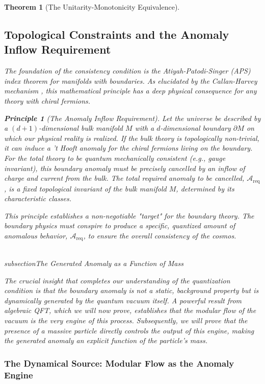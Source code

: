 \documentclass[11pt, letterpaper]{report}
\theoremstyle{plain} %
\newtheorem{theorem}{Theorem}[chapter]
\theoremstyle{definition} %
\newtheorem{principle}{Principle}[chapter]
\theoremstyle{remark} %
\newcommand{\BulkM}{M}
\newcommand{\BoundaryM}{\partial\BulkM}
\begin{document}
\begin{theorem}[The Unitarity-Monotonicity Equivalence]
\subsection{Topological Constraints and the Anomaly Inflow Requirement}
\label{sec:topological_constraints_anomaly_inflow}
The foundation of the consistency condition is the Atiyah-Patodi-Singer (APS) index theorem for manifolds with boundaries. As elucidated by the Callan-Harvey mechanism \cite{CallanHarvey1985}, this mathematical principle has a deep physical consequence for any theory with chiral fermions.

\begin{principle}[The Anomaly Inflow Requirement]
\label{principle:anomaly_inflow_c4}
Let the universe be described by a $(d+1)$-dimensional bulk manifold $\BulkM$ with a $d$-dimensional boundary $\BoundaryM$ on which our physical reality is realized. If the bulk theory is topologically non-trivial, it can induce a 't Hooft anomaly for the chiral fermions living on the boundary. For the total theory to be quantum mechanically consistent (e.g., gauge invariant), this boundary anomaly must be precisely cancelled by an inflow of charge and current from the bulk. The total required anomaly to be cancelled, $\mathcal{A}_{\text{req}}$, is a fixed topological invariant of the bulk manifold $\BulkM$, determined by its characteristic classes.
\end{principle}

This principle establishes a non-negotiable "target" for the boundary theory. The boundary physics must conspire to produce a specific, quantized amount of anomalous behavior, $\mathcal{A}_{\text{req}}$, to ensure the overall consistency of the cosmos.

\\subsection{The Generated Anomaly as a Function of Mass}
\label{sec:generated_anomaly_as_function_of_mass}

The crucial insight that completes our understanding of the quantization condition is that the boundary anomaly is not a static, background property but is dynamically generated by the quantum vacuum itself. A powerful result from algebraic QFT, which we will now prove, establishes that the modular flow of the vacuum is the very engine of this process. Subsequently, we will prove that the presence of a massive particle directly controls the output of this engine, making the generated anomaly an explicit function of the particle's mass.

\subsubsection{The Dynamical Source: Modular Flow as the Anomaly Engine}
\label{subsubsec:modular_flow_engine}


\end{theorem}
\end{document}
